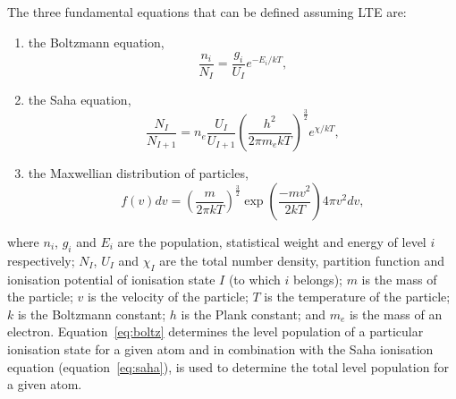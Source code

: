 The three fundamental equations that can be defined assuming LTE are:

\begin{enumerate}
    \item the Boltzmann equation,
    \begin{equation}
        \frac{n_i}{N_I} = \frac{g_i}{U_I}e^{-E_i/kT},\label{eq:boltz}
    \end{equation}
    \item the Saha equation,
    \begin{equation}
        \frac{N_I}{N_{I+1}} = n_e\frac{U_I}{U_{I+1}}\left(\frac{h^2}{2\pi m_ekT}\right)^\frac{3}{2} e^{\chi/kT},
        \label{eq:saha}
    \end{equation}
    \item the Maxwellian distribution of particles,
    \begin{equation}
        f(v)dv = \left(\frac{m}{2\pi kT}\right)^\frac{3}{2} \exp\left(\frac{-mv^2}{2kT}\right)4\pi v^2dv,
        \label{eq:max}
    \end{equation}
\end{enumerate}

where $n_i$, $g_i$ and $E_i$ are the population, statistical weight and energy of level $i$ respectively;
$N_I$, $U_I$ and $\chi_I$ are the total number density, partition function and ionisation potential of ionisation state $I$ (to which $i$ belongs);
$m$ is the mass of the particle; $v$ is the velocity of the particle; $T$ is the temperature of the particle; $k$ is the Boltzmann constant; $h$ is the Plank constant; and $m_e$ is the mass of an electron.
Equation~\ref{eq:boltz} determines the level population of a particular ionisation state for a given atom and in combination with the Saha ionisation equation (equation~\ref{eq:saha}), is used to determine the total level population for a given atom.






